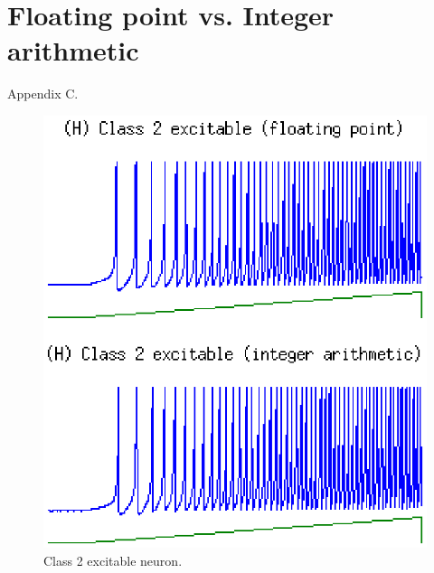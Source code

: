 \documentclass[journal]{./sty/IEEEtran}
\begin{document}
\section{Floating point vs. Integer arithmetic}
Appendix C.

\begin{figure}
\centering
\includegraphics[scale=0.6]{imgs/izh_class_2_excitable}
\caption{Class 2 excitable neuron.\label{fig:excit2}}
\end{figure}
\end{document}
